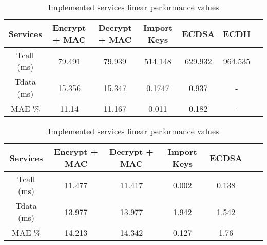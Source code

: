\begin{table}[]
\centering
\def\arraystretch{1.5}
\begin{tabular}{|c|c|c|c|c|c|c|}
\hline
Services   & Encrypt + MAC	  & Decrypt + MAC  & Import Keys & ECDSA & ECDH   \\ \hline
	Tcall (ms) & 79.491 & 79.939 & 514.148  & 629.932 & 964.535 \\ \hline
	Tdata (ms) & 15.356 & 15.347 & 0.1747 & 0.937 & - \\ \hline
	MAE \%	   & 11.14 & 11.167 & 0.011 & 0.182 & - \\ \hline
\end{tabular}
\caption{Implemented services linear performance values}
\label{tab:services-model}
\end{table}

\begin{table}[]
\centering
\def\arraystretch{1.5}
\begin{tabular}{|c|c|c|c|c|c|c|}
\hline
Services   & Encrypt + MAC	  & Decrypt + MAC  & Import Keys & ECDSA   \\ \hline
	Tcall (ms) & 11.477 & 11.417 & 0.002 & 0.138 \\ \hline
	Tdata (ms) & 13.977 & 13.977 & 1.942 & 1.542 \\ \hline
	MAE \%	   & 14.213 & 14.342 & 0.127 & 1.76 \\ \hline
\end{tabular}
\caption{Implemented services linear performance values}
\label{tab:services-model}
\end{table}

